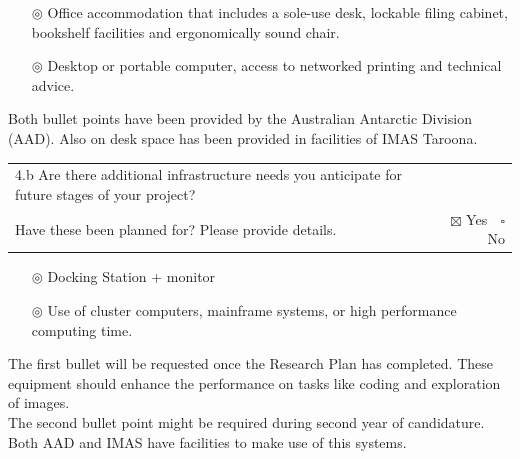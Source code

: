 \documentclass[11pt,a4paper,oneside]{report}
\begin{document}
\begin{mdframed}[everyline=true,splittopskip=20pt,splitbottomskip=20pt]
\vspace{2ex}
\begin{itemize}
\item[$\circledcirc$] Office accommodation that includes a sole-use desk, lockable filing cabinet,  bookshelf facilities and ergonomically sound chair.
\item[$\circledcirc$] Desktop or portable computer, access to networked printing and technical advice.
\end{itemize}

Both bullet points have been provided by the Australian Antarctic Division (AAD). Also on desk space has been provided in facilities of IMAS Taroona.
\vspace{1ex}
\end{mdframed}

\begin{tabular}{ llll }
4.b Are there additional infrastructure needs you anticipate for future stages of your project? \\ Have these been planned for? Please provide details.  & \multicolumn{3}{r}{ \hspace{-0.9cm} $\boxtimes$ Yes $\;$ $\square$ No} \\
\end{tabular}

\begin{mdframed}[everyline=true,splittopskip=20pt,splitbottomskip=20pt]
\vspace{2ex}
\begin{itemize}
\item[$\circledcirc$] Docking Station +  monitor  
\item[$\circledcirc$] Use of cluster computers, mainframe systems, or high performance computing time.
\end{itemize}

The first bullet will be requested once the Research Plan has completed. These equipment  should enhance the performance on tasks like coding and exploration of images.\\
The second bullet point might be required during second year of candidature. Both AAD and IMAS have facilities to make use of this systems. 
\end{mdframed}

\end{document}
